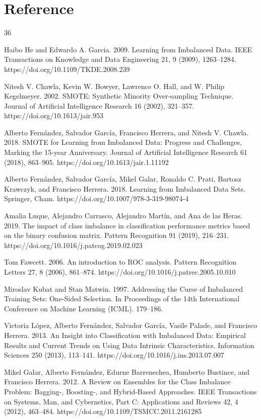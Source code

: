 \documentclass[sigconf]{acmart}
\begin{document}
\section{Reference}

\begin{thebibliography}{36}

 Haibo He and Edwardo A. Garcia. 2009. Learning from Imbalanced Data. IEEE Transactions on Knowledge and Data Engineering 21, 9 (2009), 1263–1284. https://doi.org/10.1109/TKDE.2008.239

 Nitesh V. Chawla, Kevin W. Bowyer, Lawrence O. Hall, and W. Philip Kegelmeyer. 2002. SMOTE: Synthetic Minority Over-sampling Technique. Journal of Artificial Intelligence Research 16 (2002), 321–357. https://doi.org/10.1613/jair.953

 Alberto Fernández, Salvador García, Francisco Herrera, and Nitesh V. Chawla. 2018. SMOTE for Learning from Imbalanced Data: Progress and Challenges, Marking the 15-year Anniversary. Journal of Artificial Intelligence Research 61 (2018), 863–905. https://doi.org/10.1613/jair.1.11192

 Alberto Fernández, Salvador García, Mikel Galar, Ronaldo C. Prati, Bartosz Krawczyk, and Francisco Herrera. 2018. Learning from Imbalanced Data Sets. Springer, Cham. https://doi.org/10.1007/978-3-319-98074-4

 Amalia Luque, Alejandro Carrasco, Alejandro Martín, and Ana de las Heras. 2019. The impact of class imbalance in classification performance metrics based on the binary confusion matrix. Pattern Recognition 91 (2019), 216–231. https://doi.org/10.1016/j.patcog.2019.02.023

 Tom Fawcett. 2006. An introduction to ROC analysis. Pattern Recognition Letters 27, 8 (2006), 861–874. https://doi.org/10.1016/j.patrec.2005.10.010

 Miroslav Kubat and Stan Matwin. 1997. Addressing the Curse of Imbalanced Training Sets: One-Sided Selection. In Proceedings of the 14th International Conference on Machine Learning (ICML). 179–186.

 Victoria López, Alberto Fernández, Salvador García, Vasile Palade, and Francisco Herrera. 2013. An Insight into Classification with Imbalanced Data: Empirical Results and Current Trends on Using Data Intrinsic Characteristics. Information Sciences 250 (2013), 113–141. https://doi.org/10.1016/j.ins.2013.07.007

 Mikel Galar, Alberto Fernández, Edurne Barrenechea, Humberto Bustince, and Francisco Herrera. 2012. A Review on Ensembles for the Class Imbalance Problem: Bagging-, Boosting-, and Hybrid-Based Approaches. IEEE Transactions on Systems, Man, and Cybernetics, Part C: Applications and Reviews 42, 4 (2012), 463–484. https://doi.org/10.1109/TSMCC.2011.2161285


\end{thebibliography}
\end{document}
